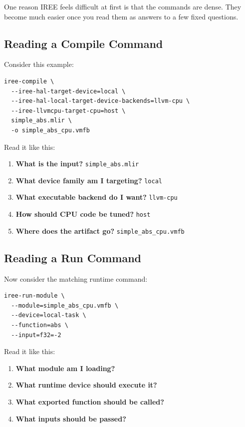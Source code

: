 \documentclass[11pt,a4paper]{article}
\begin{document}
One reason IREE feels difficult at first is that the commands are dense. They become much easier once you read them as answers to a few fixed questions.

\subsection{Reading a Compile Command}

Consider this example:

\begin{lstlisting}[caption=An annotated compile command]
iree-compile \
  --iree-hal-target-device=local \
  --iree-hal-local-target-device-backends=llvm-cpu \
  --iree-llvmcpu-target-cpu=host \
  simple_abs.mlir \
  -o simple_abs_cpu.vmfb
\end{lstlisting}

Read it like this:
\begin{enumerate}
    \item \textbf{What is the input?} \texttt{simple\_abs.mlir}
    \item \textbf{What device family am I targeting?} \texttt{local}
    \item \textbf{What executable backend do I want?} \texttt{llvm-cpu}
    \item \textbf{How should CPU code be tuned?} \texttt{host}
    \item \textbf{Where does the artifact go?} \texttt{simple\_abs\_cpu.vmfb}
\end{enumerate}

\subsection{Reading a Run Command}

Now consider the matching runtime command:

\begin{lstlisting}[caption=An annotated run command]
iree-run-module \
  --module=simple_abs_cpu.vmfb \
  --device=local-task \
  --function=abs \
  --input=f32=-2
\end{lstlisting}

Read it like this:
\begin{enumerate}
    \item \textbf{What module am I loading?}
    \item \textbf{What runtime device should execute it?}
    \item \textbf{What exported function should be called?}
    \item \textbf{What inputs should be passed?}
\end{enumerate}
\end{document}
